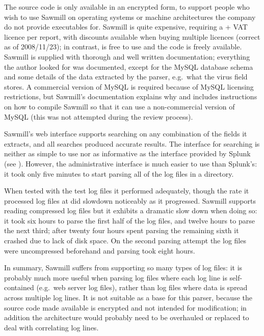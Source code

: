 The source code is only available in an encrypted form, to support people
who wish to use Sawmill on operating systems or machine architectures the
company do not provide executables for.  Sawmill is quite expensive,
requiring a  + VAT licence per report, with discounts available
when buying multiple licences (correct as of 2008/11/23); in contrast,
\parsername{} is free to use and the code is freely available.  Sawmill is
supplied with thorough and well written documentation; everything the
author looked for was documented, except for the MySQL database schema and
some details of the data extracted by the parser, e.g.\ what the virus
field stores.  A commercial version of MySQL is required because of MySQL
licensing restrictions, but Sawmill's documentation explains why and
includes instructions on how to compile Sawmill so that it can use a
non-commercial version of MySQL (this was not attempted during the review
process).

Sawmill's web interface supports searching on any combination of the fields
it extracts, and all searches produced accurate results.  The interface for
searching is neither as simple to use nor as informative as the interface
provided by Splunk (see ).  However, the
administrative interface is much easier to use than Splunk's: it took only
five minutes to start parsing all of the log files in a directory.

When tested with the \numberOFlogFILES{} test log files it performed
adequately, though the rate it processed log files at did slowdown
noticeably as it progressed.  Sawmill supports reading compressed log files
but it exhibits a dramatic slow down when doing so: it took six hours to
parse the first half of the log files, and twelve hours to parse the next
third; after twenty four hours spent parsing the remaining sixth it crashed
due to lack of disk space.  On the second parsing attempt the log files
were uncompressed beforehand and parsing took eight hours.

In summary, Sawmill suffers from supporting so many types of log files: it
is probably much more useful when parsing log files where each log line is
self-contained (e.g.\ web server log files), rather than log files where
data is spread across multiple log lines.  It is not suitable as a base for
this parser, because the source code made available is encrypted and not
intended for modification; in addition the architecture would probably need
to be overhauled or replaced to deal with correlating log lines.

